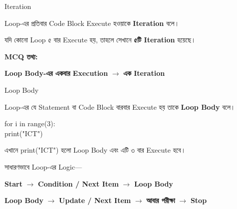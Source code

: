 \noindent
\begin{minipage}[t]{0.49\linewidth}

\begin{sideexamplebox}{Iteration}

Loop-এর প্রতিবার Code Block Execute হওয়াকে
\textbf{Iteration} বলে।

যদি কোনো Loop ৫ বার Execute হয়, তাহলে সেখানে
\textbf{৫টি Iteration} হয়েছে।

\medskip

\textbf{MCQ তথ্য:}

\begin{center}
\textbf{Loop Body-এর একবার Execution}
\(\longrightarrow\)
\textbf{এক Iteration}
\end{center}

\end{sideexamplebox}

\end{minipage}
\hfill
\begin{minipage}[t]{0.49\linewidth}

\begin{sideexamplebox}{Loop Body}

Loop-এর যে Statement বা Code Block বারবার Execute হয় তাকে
\textbf{Loop Body} বলে।

\begin{sidecodebox}
\begin{english}
\ttfamily
for i in range(3):\\
\hspace*{4mm}print("ICT")
\end{english}
\end{sidecodebox}

এখানে
\textenglish{\ttfamily print("ICT")}
হলো Loop Body এবং এটি ৩ বার Execute হবে।

\end{sideexamplebox}

\end{minipage}



সাধারণভাবে Loop-এর Logic—

\begin{center}

\textbf{Start}
\(\longrightarrow\)
\textbf{Condition / Next Item}
\(\longrightarrow\)
\textbf{Loop Body}

\medskip

\textbf{Loop Body}
\(\longrightarrow\)
\textbf{Update / Next Item}
\(\longrightarrow\)
\textbf{আবার পরীক্ষা}
\(\longrightarrow\)
\textbf{Stop}

\end{center}

